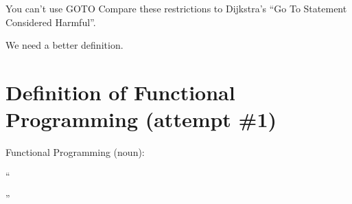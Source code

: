\documentclass{beamer}
\begin{document}
\begin{frame}{You can't use GOTO}
Compare these restrictions to Dijkstra's
``Go To Statement Considered Harmful''.
\end{frame}

\begin{frame}{}
We need a better definition.
\end{frame}

\section{Definition of Functional Programming (attempt \#1)}

\begin{frame}{Functional Programming (noun):}

\begin{exampleblock}{}
  {\large ``

  ''}
  \vskip5mm
  \hspace*{}
\end{exampleblock}
\end{frame}
\end{document}
